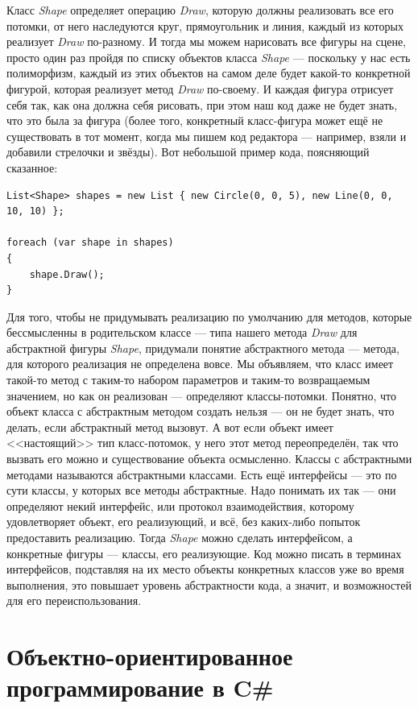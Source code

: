 \documentclass{../../text-style}
\begin{document}
Класс \textit{Shape} определяет операцию \textit{Draw}, которую должны реализовать все его потомки, от него наследуются круг, прямоугольник и линия, каждый из которых реализует \textit{Draw} по-разному. И тогда мы можем нарисовать все фигуры на сцене, просто один раз пройдя по списку объектов класса \textit{Shape} --- поскольку у нас есть полиморфизм, каждый из этих объектов на самом деле будет какой-то конкретной фигурой, которая реализует метод \textit{Draw} по-своему. И каждая фигура отрисует себя так, как она должна себя рисовать, при этом наш код даже не будет знать, что это была за фигура (более того, конкретный класс-фигура может ещё не существовать в тот момент, когда мы пишем код редактора --- например, взяли и добавили стрелочки и звёзды). Вот небольшой пример кода, поясняющий сказанное:

\begin{verbatim}
List<Shape> shapes = new List { new Circle(0, 0, 5), new Line(0, 0, 10, 10) };

foreach (var shape in shapes)
{
    shape.Draw();
}
\end{verbatim}

Для того, чтобы не придумывать реализацию по умолчанию для методов, которые бессмысленны в родительском классе --- типа нашего метода \textit{Draw} для абстрактной фигуры \textit{Shape}, придумали понятие абстрактного метода --- метода, для которого реализация не определена вовсе. Мы объявляем, что класс имеет такой-то метод с таким-то набором параметров и таким-то возвращаемым значением, но как он реализован --- определяют классы-потомки. Понятно, что объект класса с абстрактным методом создать нельзя --- он не будет знать, что делать, если абстрактный метод вызовут. А вот если объект имеет <<настоящий>> тип класс-потомок, у него этот метод переопределён, так что вызвать его можно и существование объекта осмысленно. Классы с абстрактными методами называются абстрактными классами. Есть ещё интерфейсы --- это по сути классы, у которых все методы абстрактные. Надо понимать их так --- они определяют некий интерфейс, или протокол взаимодействия, которому удовлетворяет объект, его реализующий, и всё, без каких-либо попыток предоставить реализацию. Тогда \textit{Shape} можно сделать интерфейсом, а конкретные фигуры --- классы, его реализующие. Код можно писать в терминах интерфейсов, подставляя на их место объекты конкретных классов уже во время выполнения, это повышает уровень абстрактности кода, а значит, и возможностей для его переиспользования.

\section{Объектно-ориентированное программирование в C\#}
\end{document}
